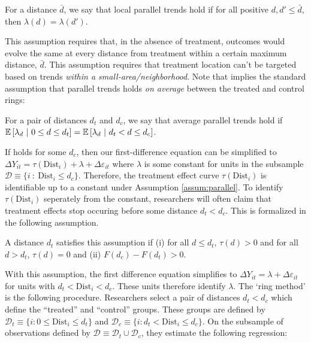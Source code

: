 \documentclass[10pt]{article}
\newcommand{\dist}{\text{Dist}}
\begin{document}
\begin{assumption}\label{assum:parallel}
    For a distance $\bar{d}$, we say that local parallel trends hold if for all positive $d, d' \leq \bar{d}$, then $\lambda(d) = \lambda(d')$.
\end{assumption}

This assumption requires that, in the absence of treatment, outcomes would evolve the same at every distance from treatment within a certain maximum distance, $\bar{d}$. This assumption requires that treatment location can't be targeted based on trends \emph{within a small-area/neighborhood}. Note that  implies the standard assumption that parallel trends holds \emph{on average} between the treated and control rings:

\begin{assumption}\label{assum:parallel_weak}
    For a pair of distances $d_t$ and $d_c$, we say that average parallel trends hold if $\mathbb{E}\left[\lambda_d \ \vert \ 0 \leq d \leq d_t\right] = \mathbb{E}\left[\lambda_d \ \vert \ d_t < d \leq d_c\right]$.
\end{assumption}

If  holds for some $d_c$, then our first-difference equation can be simplified to $\Delta Y_{it} = \tau(\dist_i) + \lambda + \Delta \varepsilon_{it}$ where $\lambda$ is some constant for units in the subsample $\mathcal{D} \equiv \{i \ : \ \dist_i \leq d_c \} $. Therefore, the treatment effect curve $\tau(\dist_i)$ is identifiable up to a constant under Assumption \ref{assum:parallel}. To identify $\tau(\dist_i)$ seperately from the constant, researchers will often claim that treatment effects stop occuring before some distance $d_t < d_c$. This is formalized in  the following assumption. 

\begin{assumption}[Correct $d_t$]\label{assum:dt}
    A distance $d_t$ satisfies this assumption if (i) for all $d \leq d_t$, $\tau(d) > 0$ and for all $d > d_t$, $\tau(d) = 0$ and (ii) $F(d_c) - F(d_t) > 0$.
\end{assumption}

With this assumption, the first difference equation simplifies to $\Delta Y_{it} = \lambda + \Delta \varepsilon_{it}$ for units with $d_t < \dist_i < d_c$. These units therefore identify $\lambda$. The `ring method' is the following procedure. Researchers select a pair of distances $d_t < d_c$ which define the ``treated'' and ``control'' groups. These groups are defined by $\mathcal{D}_t \equiv \{ i : 0 \leq \dist_i \leq d_t \}$ and $\mathcal{D}_c \equiv \{ i : d_t < \dist_i \leq d_c \}$. On the subsample of observations defined by $\mathcal{D} \equiv \mathcal{D}_t \cup \mathcal{D}_c$, they estimate the following regression:
\end{document}
